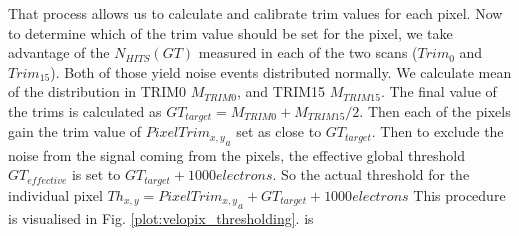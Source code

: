 That process allows us to calculate and calibrate trim values for each pixel.
Now to determine which of the trim value should be set for the pixel, we
take advantage of the $N_{HITS}(GT)$ measured in each of the two scans ($Trim_{0}$ and $Trim_{15}$). Both of those
yield noise events distributed normally.
We calculate mean of the distribution in TRIM0 $M_{TRIM0}$, and TRIM15
$M_{TRIM15}$. The final value of the trims is calculated as
$GT_{target} = M_{TRIM0}+M_{TRIM15}/2$.
Then each of the pixels gain the trim value of ${PixelTrim_{x,y}}_{a}$ set as close to
$GT_{target}$.
Then to exclude the noise from the signal coming from the pixels, the
effective global threshold $GT_{effective}$ is set to
$GT_{target} + 1000 electrons$.
So the actual threshold for the individual pixel
$Th_{x,y} = {PixelTrim_{x,y}}_{a} + GT_{target} + 1000 electrons$
This procedure is visualised in Fig. \ref{plot:velopix_thresholding}.
is
